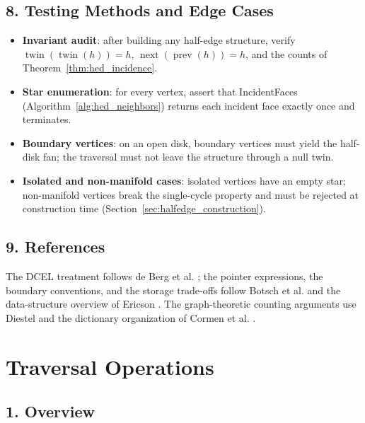 \subsection{8. Testing Methods and Edge Cases}

\begin{itemize}
  \item \textbf{Invariant audit}: after building any half-edge structure,
    verify $\operatorname{twin}(\operatorname{twin}(h)) = h$,
    $\operatorname{next}(\operatorname{prev}(h)) = h$, and the counts of
    Theorem~\ref{thm:hed_incidence}.
  \item \textbf{Star enumeration}: for every vertex, assert that
    IncidentFaces (Algorithm~\ref{alg:hed_neighbors}) returns each incident
    face exactly once and terminates.
  \item \textbf{Boundary vertices}: on an open disk, boundary vertices must
    yield the half-disk fan; the traversal must not leave the structure
    through a null twin.
  \item \textbf{Isolated and non-manifold cases}: isolated vertices have an
    empty star; non-manifold vertices break the single-cycle property and
    must be rejected at construction time
    (Section~\ref{sec:halfedge_construction}).
\end{itemize}

\subsection{9. References}

The DCEL treatment follows de Berg et al. \cite{deberg2008}; the pointer
expressions, the boundary conventions, and the storage trade-offs follow
Botsch et al. \cite{botsch2010} and the data-structure overview of Ericson
\cite{ericson2004}. The graph-theoretic counting arguments use
Diestel \cite{diestel2017} and the dictionary organization of
Cormen et al. \cite{cormen2009}.


\section{Traversal Operations}
\label{sec:halfedge_traversal}

\subsection{1. Overview}

